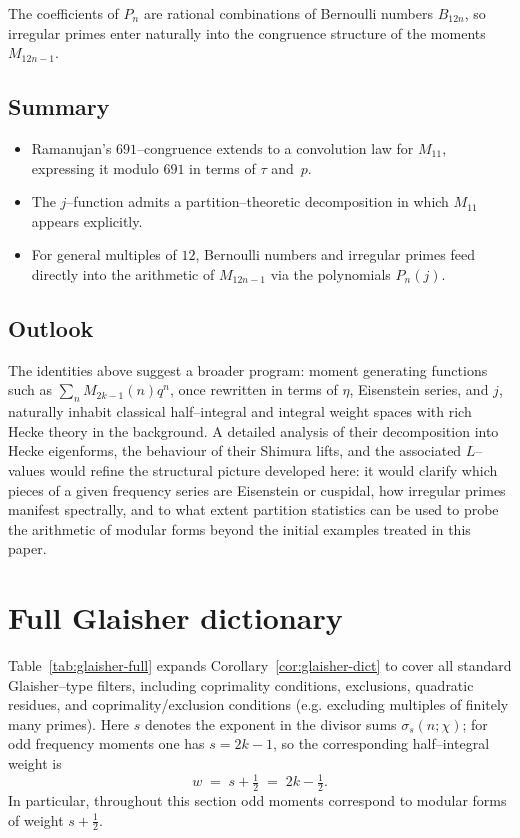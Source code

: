 \documentclass[11pt]{article}
\theoremstyle{definition}
\theoremstyle{remark}
\begin{document}
The coefficients of $P_n$ are rational combinations of Bernoulli
numbers $B_{12n}$, so irregular primes enter naturally into the
congruence structure of the moments $M_{12n-1}$.

\subsection{Summary}

\begin{itemize}
  \item Ramanujan’s $691$--congruence extends to a convolution law for
  $M_{11}$, expressing it modulo $691$ in terms of $\tau$ and~$p$.
  \item The $j$--function admits a partition--theoretic decomposition
  in which $M_{11}$ appears explicitly.
  \item For general multiples of $12$, Bernoulli numbers and irregular
  primes feed directly into the arithmetic of $M_{12n-1}$ via the
  polynomials $P_n(j)$.
\end{itemize}

\subsection*{Outlook}

The identities above suggest a broader program: moment generating
functions such as $\sum_n M_{2k-1}(n)q^n$, once rewritten in terms of
$\eta$, Eisenstein series, and $j$, naturally inhabit classical
half–integral and integral weight spaces with rich Hecke theory in the
background.  A detailed analysis of their decomposition into Hecke
eigenforms, the behaviour of their Shimura lifts, and the associated
$L$–values would refine the structural picture developed here: it would
clarify which pieces of a given frequency series are Eisenstein or
cuspidal, how irregular primes manifest spectrally, and to what extent
partition statistics can be used to probe the arithmetic of modular
forms beyond the initial examples treated in this paper.

\appendix
\section{Full Glaisher dictionary}\label{app:glaisher}

Table~\ref{tab:glaisher-full} expands Corollary~\ref{cor:glaisher-dict}
to cover all standard Glaisher--type filters, including coprimality
conditions, exclusions, quadratic residues, and coprimality/exclusion conditions (e.g. excluding multiples of finitely many primes). Here $s$ denotes the exponent in the divisor sums $\sigma_s(n;\chi)$; for
odd frequency moments one has $s = 2k-1$, so the corresponding
half--integral weight is
\[
  w \;=\; s + \tfrac12 \;=\; 2k - \tfrac12.
\]
In particular, throughout this section odd moments correspond to
modular forms of weight $s+\tfrac12$.
\end{document}
